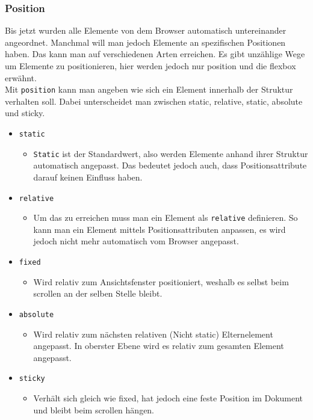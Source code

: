 \documentclass{article}
\begin{document}
	\subsubsection{Position}
	Bis jetzt wurden alle Elemente von dem Browser automatisch untereinander angeordnet. Manchmal will man jedoch Elemente an spezifischen Positionen haben. Das kann man auf verschiedenen Arten erreichen. Es gibt unzählige Wege um Elemente zu positionieren, hier werden jedoch nur position und die flexbox erwähnt. \\
	Mit \texttt{position} kann man angeben wie sich ein Element innerhalb der Struktur verhalten soll. Dabei unterscheidet man zwischen static, relative, static, absolute und sticky. 
	\begin{itemize}
		\item{\texttt{static}}
		\begin{itemize}
			\item{\texttt{Static} ist der Standardwert, also werden Elemente anhand ihrer Struktur automatisch angepasst. Das bedeutet jedoch auch, dass Positionsattribute darauf keinen Einfluss haben. }
		\end{itemize}
		\item{\texttt{relative}}
		\begin{itemize}
			\item{Um das zu erreichen muss man ein Element als \texttt{relative} definieren. So kann man ein Element mittels Positionsattributen anpassen, es wird jedoch nicht mehr automatisch vom Browser angepasst.}
		\end{itemize}
		\item{\texttt{fixed}}
		\begin{itemize}
			\item{Wird relativ zum Ansichtsfenster positioniert, weshalb es selbst beim scrollen an der selben Stelle bleibt.}
		\end{itemize}
		\item{\texttt{absolute}}
		\begin{itemize}
			\item{Wird relativ zum nächsten relativen (Nicht static) Elternelement angepasst. In oberster Ebene wird es relativ zum gesamten Element angepasst.}
		\end{itemize}
		\item{\texttt{sticky}}
		\begin{itemize}
			\item{Verhält sich gleich wie fixed, hat jedoch eine feste Position im Dokument und bleibt beim scrollen hängen.}
		\end{itemize}
	\end{itemize}
\end{document}
